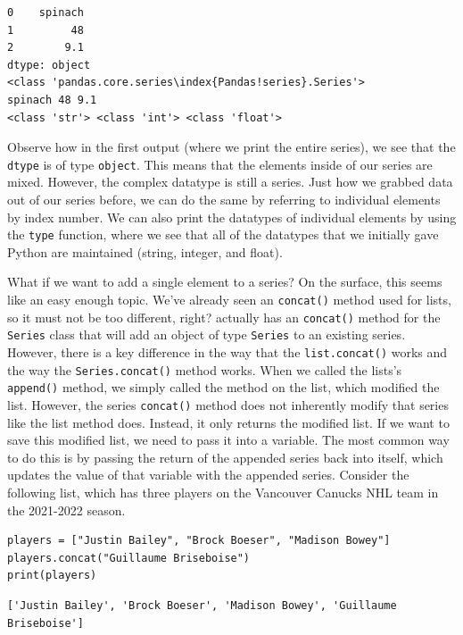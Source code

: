 \begin{lstlisting}
0    spinach
1         48
2        9.1
dtype: object
<class 'pandas.core.series\index{Pandas!series}.Series'>
spinach 48 9.1
<class 'str'> <class 'int'> <class 'float'>
\end{lstlisting}
Observe how in the first output (where we print the entire series), we see that the \verb|dtype| is of type \verb|object|. This means that the elements inside of our series are mixed. However, the complex datatype is still a series. Just how we grabbed data out of our series before, we can do the same by referring to individual elements by index number. We can also print the datatypes of individual elements by using the \verb|type| function, where we see that all of the datatypes that we initially gave Python are maintained (string, integer, and float).\par
What if we want to add a single element to a series? On the surface, this seems like an easy enough topic. We've already seen an \verb|concat()| method used for lists, so it must not be too different, right?  actually has an \verb|concat()| method for the \verb|Series| class that will add an object of type \verb|Series| to an existing series. However, there is a key difference in the way that the \verb|list.concat()| works and the way the \verb|Series.concat()| method works. When we called the lists's \verb|append()| method, we simply called the method on the list, which modified the list. However, the  series \verb|concat()| method does not inherently modify that series like the list method does. Instead, it only returns the modified list. If we want to save this modified list, we need to pass it into a variable. The most common way to do this is by passing the return of the appended series back into itself, which updates the value of that variable with the appended series.
Consider the following list, which has three players on the Vancouver Canucks NHL team in the 2021-2022 season.\par
\begin{lstlisting}[style=pippython]
players = ["Justin Bailey", "Brock Boeser", "Madison Bowey"]
players.concat("Guillaume Briseboise")
print(players)
\end{lstlisting}
\begin{lstlisting}[style=none]
['Justin Bailey', 'Brock Boeser', 'Madison Bowey', 'Guillaume Briseboise']
\end{lstlisting}
